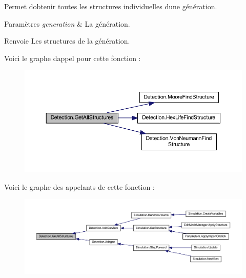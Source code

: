 Permet d\textquotesingle{}obtenir toutes les structures individuelles d\textquotesingle{}une génération. 


\begin{DoxyParams}{Paramètres}
{\em generation} & La génération.\\
\hline
\end{DoxyParams}
\begin{DoxyReturn}{Renvoie}
Les structures de la génération.
\end{DoxyReturn}
Voici le graphe d\textquotesingle{}appel pour cette fonction \+:
\nopagebreak
\begin{figure}[H]
\begin{center}
\leavevmode
\includegraphics[width=350pt]{class_detection_a56dffa1e7a06c20bfaa24ac287a9883f_cgraph}
\end{center}
\end{figure}
Voici le graphe des appelants de cette fonction \+:
\nopagebreak
\begin{figure}[H]
\begin{center}
\leavevmode
\includegraphics[width=350pt]{class_detection_a56dffa1e7a06c20bfaa24ac287a9883f_icgraph}
\end{center}
\end{figure}
\mbox{\label{class_detection_a5fa3f90802c6cc9eb57c9ca7bcf417b8}} 
